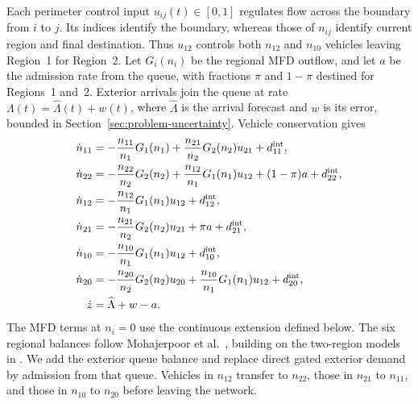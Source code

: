 \documentclass[preprint,12pt]{elsarticle}
\theoremstyle{definition}
\theoremstyle{plain}
\theoremstyle{definition}
\theoremstyle{plain}
\begin{document}
Each perimeter control input $u_{ij}(t)\in[0,1]$ regulates flow across
the boundary from $i$ to $j$. Its indices identify the boundary, whereas
those of $n_{ij}$ identify current region and final destination. Thus
$u_{12}$ controls both $n_{12}$ and $n_{10}$ vehicles leaving Region~1
for Region~2. Let $G_i(n_i)$ be the regional MFD outflow, and let $a$ be
the admission rate from the queue, with fractions $\pi$ and $1-\pi$
destined for Regions~1 and~2. Exterior arrivals join the queue at rate
$\Lambda(t)=\widehat\Lambda(t)+w(t)$, where $\widehat\Lambda$ is the
arrival forecast and $w$ is its error, bounded in
Section~\ref{sec:problem-uncertainty}. Vehicle conservation gives
\begin{equation}
\begin{aligned}
\dot n_{11}&=-\frac{n_{11}}{n_1}G_1(n_1)
                 +\frac{n_{21}}{n_2}G_2(n_2)u_{21}+d_{11}^{\rm int},\\
\dot n_{22}&=-\frac{n_{22}}{n_2}G_2(n_2)
                 +\frac{n_{12}}{n_1}G_1(n_1)u_{12}+(1-\pi)a+d_{22}^{\rm int},\\
\dot n_{12}&=-\frac{n_{12}}{n_1}G_1(n_1)u_{12}+d_{12}^{\rm int},\\
\dot n_{21}&=-\frac{n_{21}}{n_2}G_2(n_2)u_{21}+\pi a+d_{21}^{\rm int},\\
\dot n_{10}&=-\frac{n_{10}}{n_1}G_1(n_1)u_{12}+d_{10}^{\rm int},\\
\dot n_{20}&=-\frac{n_{20}}{n_2}G_2(n_2)u_{20}
                 +\frac{n_{10}}{n_1}G_1(n_1)u_{12}+d_{20}^{\rm int},\\
\dot z&=\widehat\Lambda+w-a.
\end{aligned}
\label{eq:destination-class-balances}
\end{equation}
The MFD terms at $n_i=0$ use the continuous extension defined below.
The six regional balances follow Mohajerpoor et al.~\cite{mohajerpoor2020hinf}, building
on the two-region models in
\cite{geroliminis2013mpc,zhong2018robust}. We add the exterior queue
balance and replace direct gated exterior demand by admission from that
queue. Vehicles in $n_{12}$ transfer to $n_{22}$, those in $n_{21}$ to
$n_{11}$, and those in $n_{10}$ to $n_{20}$ before leaving the network.
\end{document}
